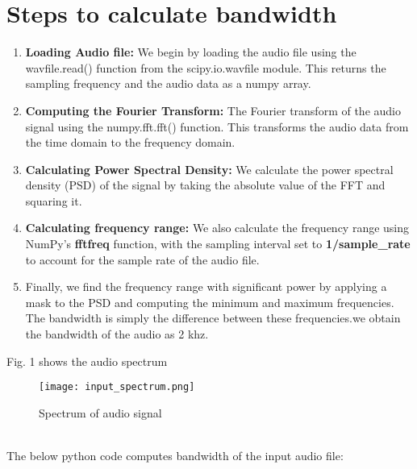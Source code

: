 \documentclass[journal,12pt,twocolumn]{article}
\begin{document}
\section{Steps to calculate bandwidth}
\begin{enumerate}

\item \textbf{Loading Audio file:}
We begin by loading the audio file using the wavfile.read() function from the scipy.io.wavfile module. This returns the sampling frequency and the audio data as a numpy array.

\item \textbf{Computing the Fourier Transform:}
	The Fourier transform of the audio signal using the numpy.fft.fft() function. This transforms the audio data from the time domain to the frequency domain.
	
\item \textbf{Calculating Power Spectral Density: }
We calculate the power spectral density (PSD) of the signal by taking the absolute value of the FFT and squaring it.

\item \textbf{Calculating frequency range:}
We also calculate the frequency range using NumPy's \textbf{fftfreq} function, with the sampling interval set to \textbf{1/sample\_rate} to account for the sample rate of the audio file.

\item Finally, we find the frequency range with significant power by applying a mask to the PSD and computing the minimum and maximum frequencies. The bandwidth is simply the difference between these frequencies.we obtain the bandwidth of the audio as 2 khz.
\end{enumerate}
\newpage
Fig. 1 shows the audio spectrum
\begin{figure}[h]
    \centering
\texttt{[image: input\_spectrum.png]} 
    \label{fig:my_label}
    \caption{Spectrum of audio signal}
\end{figure}\\
The below python code computes bandwidth of the input audio file:
   
\end{document}
